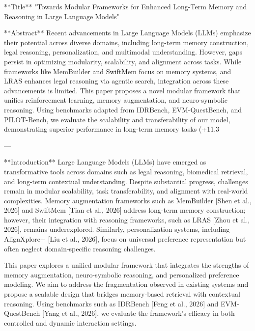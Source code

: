 **Title**  
"Towards Modular Frameworks for Enhanced Long-Term Memory and Reasoning in Large Language Models"

**Abstract**  
Recent advancements in Large Language Models (LLMs) emphasize their potential across diverse domains, including long-term memory construction, legal reasoning, personalization, and multimodal understanding. However, gaps persist in optimizing modularity, scalability, and alignment across tasks. While frameworks like MemBuilder and SwiftMem focus on memory systems, and LRAS enhances legal reasoning via agentic search, integration across these advancements is limited. This paper proposes a novel modular framework that unifies reinforcement learning, memory augmentation, and neuro-symbolic reasoning. Using benchmarks adapted from IDRBench, EVM-QuestBench, and PILOT-Bench, we evaluate the scalability and transferability of our model, demonstrating superior performance in long-term memory tasks (+11.3%

---

**Introduction**  
Large Language Models (LLMs) have emerged as transformative tools across domains such as legal reasoning, biomedical retrieval, and long-term contextual understanding. Despite substantial progress, challenges remain in modular scalability, task transferability, and alignment with real-world complexities. Memory augmentation frameworks such as MemBuilder [Shen et al., 2026] and SwiftMem [Tian et al., 2026] address long-term memory construction; however, their integration with reasoning frameworks, such as LRAS [Zhou et al., 2026], remains underexplored. Similarly, personalization systems, including AlignXplore+ [Liu et al., 2026], focus on universal preference representation but often neglect domain-specific reasoning challenges.

This paper explores a unified modular framework that integrates the strengths of memory augmentation, neuro-symbolic reasoning, and personalized preference modeling. We aim to address the fragmentation observed in existing systems and propose a scalable design that bridges memory-based retrieval with contextual reasoning. Using benchmarks such as IDRBench [Feng et al., 2026] and EVM-QuestBench [Yang et al., 2026], we evaluate the framework's efficacy in both controlled and dynamic interaction settings.

